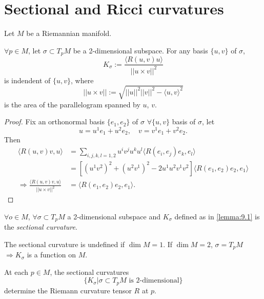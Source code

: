 \section{Sectional and Ricci curvatures}

Let $M$ be a Riemannian manifold.

\begin{lemma}\label{lemma:9.1}
$\forall p \in M$, let $\sigma \subset T_pM$ be a 2-dimensional subspace. For any basis $\{u,v\}$ of $\sigma$,
\[
K_{\sigma} := \frac{\langle R(u,v) u\rangle}{||u\times v||^2}
\]
is indendent of $\{u,v\}$, where
\[
||u\times v|| := \sqrt{||u||^2 ||v||^2 - \langle u,v\rangle^2}
\]
is the area of the parallelogram spanned by $u$, $v$.
\end{lemma}

\begin{proof}
Fix an orthonormal basis $\{e_1, e_2\}$ of $\sigma$ $\forall \{u,v\}$ basis of $\sigma$, let
\[
u = u^1e_1 + u^2 e_2, \quad v = v^1 e_1 + v^2 e_2.
\]
Then
\[
\begin{aligned}
\langle R(u,v)v, u\rangle &= \sum_{i,j,k,l=1,2}u^iv^ju^ku^l\langle R(e_i, e_j)e_k,e_l\rangle \\
&= [(u^1v^2)^2 + (u^2v^1)^2 - 2u^1u^2v^1v^2]\langle R(e_1,e_2)e_2,e_1\rangle \\
\Rightarrow \frac{\langle R(u,v)v, u\rangle}{||u\times v||^2} &= \langle R(e_1, e_2)e_2, e_1\rangle.
\end{aligned}
\]
\end{proof}

\begin{definition}
$\forall o \in M$, $\forall \sigma \subset T_pM$ a 2-dimensional subspace and
$K_{\sigma}$ defined as in \autoref{lemma:9.1} is the \emph{sectional curvature}.
\end{definition}

\begin{remark}
The sectional curvature is undefined if $\dim M =1$. If $\dim M = 2$, $\sigma = T_pM$ $\Rightarrow K_{\sigma}$ is a function on $M$.
\end{remark}

\begin{theorem}\label{theorem:9.3}
At each $p\in M$, the sectional curvatures
\[
\{K_{\sigma}|\sigma \subset T_pM \text{ is 2-dimensional}\}
\]
determine the Riemann curvature tensor $R$ at $p$.
\end{theorem}

